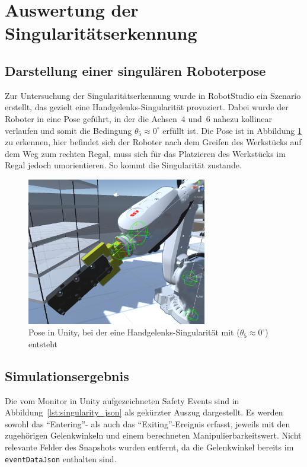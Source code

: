 \section{Auswertung der Singularitätserkennung}
\label{sec:singularityauswertung}

\subsection{Darstellung einer singulären Roboterpose}
Zur Untersuchung der Singularitätserkennung wurde in RobotStudio ein
Szenario erstellt,
das gezielt eine Handgelenks-Singularität provoziert. Dabei wurde der
Roboter in eine Pose
geführt, in der die Achsen~4 und~6 nahezu kollinear verlaufen und
somit die Bedingung
$\theta_{5} \approx 0^\circ$ erfüllt ist. Die Pose ist in Abbildung
\ref{fig:wristSingularity} zu erkennen, hier befindet sich der Roboter nach dem
Greifen des Werkstücks auf dem Weg zum rechten Regal, muss sich für das
Platzieren des Werkstücks im Regal jedoch umorientieren. So kommt die
Singularität
zustande.

\begin{figure}[H]
  \centering
  \includegraphics[width=0.7\textwidth]{figures/wristSingularity.png}
  \caption{Pose in Unity, bei der eine Handgelenks-Singularität mit
  ($\theta_{5} \approx 0^\circ$) entsteht}
  \label{fig:wristSingularity}
\end{figure}

\subsection{Simulationsergebnis}

Die vom Monitor in Unity aufgezeichneten Safety Events sind in
Abbildung~\ref{lst:singularity_json} als gekürzter Auszug
dargestellt. Es werden sowohl
das \enquote{Entering}- als auch das \enquote{Exiting}-Ereignis
erfasst, jeweils mit den
zugehörigen Gelenkwinkeln und einem berechneten
Manipulierbarkeitswert. Nicht relevante
Felder des Snapshots wurden entfernt, da die Gelenkwinkel bereits im
\texttt{eventDataJson} enthalten sind.

